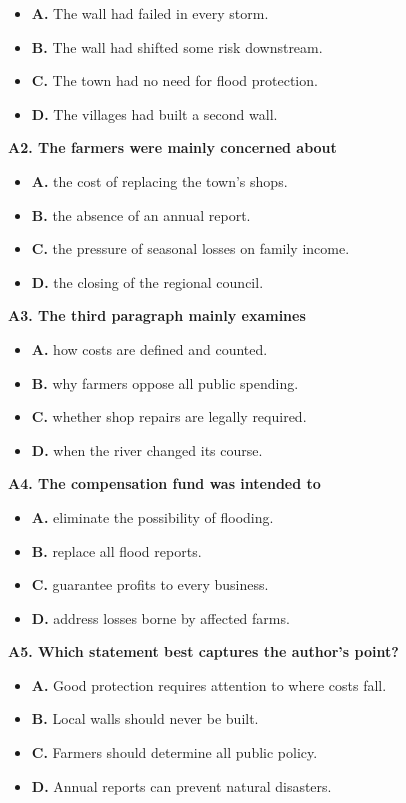 \documentclass[
  11pt,
]{ctexart}
\begin{document}
\begin{itemize}
\item
  \textbf{A.} The wall had failed in every storm.
\item
  \textbf{B.} The wall had shifted some risk downstream.
\item
  \textbf{C.} The town had no need for flood protection.
\item
  \textbf{D.} The villages had built a second wall.
\end{itemize}

\textbf{A2. The farmers were mainly concerned about}

\begin{itemize}
\item
  \textbf{A.} the cost of replacing the town's shops.
\item
  \textbf{B.} the absence of an annual report.
\item
  \textbf{C.} the pressure of seasonal losses on family income.
\item
  \textbf{D.} the closing of the regional council.
\end{itemize}

\textbf{A3. The third paragraph mainly examines}

\begin{itemize}
\item
  \textbf{A.} how costs are defined and counted.
\item
  \textbf{B.} why farmers oppose all public spending.
\item
  \textbf{C.} whether shop repairs are legally required.
\item
  \textbf{D.} when the river changed its course.
\end{itemize}

\textbf{A4. The compensation fund was intended to}

\begin{itemize}
\item
  \textbf{A.} eliminate the possibility of flooding.
\item
  \textbf{B.} replace all flood reports.
\item
  \textbf{C.} guarantee profits to every business.
\item
  \textbf{D.} address losses borne by affected farms.
\end{itemize}

\textbf{A5. Which statement best captures the author's point?}

\begin{itemize}
\item
  \textbf{A.} Good protection requires attention to where costs fall.
\item
  \textbf{B.} Local walls should never be built.
\item
  \textbf{C.} Farmers should determine all public policy.
\item
  \textbf{D.} Annual reports can prevent natural disasters.
\end{itemize}
\end{document}
